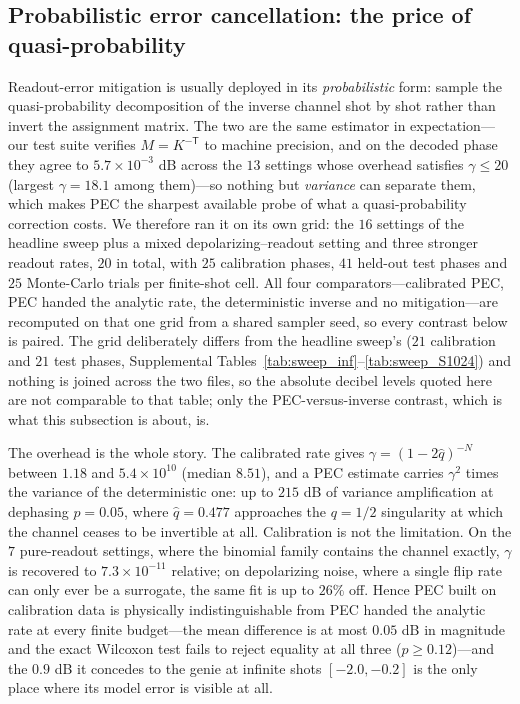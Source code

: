 \documentclass[ASNA,twocolumn]{USG}
\begin{document}
\subsection{Probabilistic error cancellation: the price of quasi-probability}
\label{subsec:pec}

Readout-error mitigation is usually deployed in its \emph{probabilistic} form:
sample the quasi-probability decomposition of the inverse channel shot by shot
rather than invert the assignment matrix.  The two are the same estimator in
expectation---our test suite verifies $M = K^{-\mathsf T}$ to machine precision,
and on the decoded phase they agree to $5.7\times10^{-3}$ dB across the $13$
settings whose overhead satisfies $\gamma\le20$ (largest $\gamma=18.1$ among
them)---so nothing but \emph{variance} can separate them, which makes PEC the
sharpest available probe of what a quasi-probability correction costs.  We
therefore ran it on its own grid: the $16$ settings of the headline sweep plus a
mixed depolarizing--readout setting and three stronger readout rates, $20$ in
total, with $25$ calibration phases, $41$ held-out test phases and $25$
Monte-Carlo trials per finite-shot cell.  All four comparators---calibrated PEC,
PEC handed the analytic rate, the deterministic inverse and no mitigation---are
recomputed on that one grid from a shared sampler seed, so every contrast below
is paired.  The grid deliberately differs from the headline sweep's ($21$
calibration and $21$ test phases, Supplemental
Tables~\ref{tab:sweep_inf}--\ref{tab:sweep_S1024}) and nothing is joined across
the two files, so the absolute decibel levels quoted here are not comparable to
that table; only the PEC-versus-inverse contrast, which is what this subsection
is about, is.

The overhead is the whole story.  The calibrated rate gives
$\gamma=(1-2\hat q)^{-N}$ between $1.18$ and $5.4\times10^{10}$ (median $8.51$),
and a PEC estimate carries $\gamma^2$ times the variance of the deterministic
one: up to $215$ dB of variance amplification at dephasing $p=0.05$, where
$\hat q=0.477$ approaches the $q=1/2$ singularity at which the channel ceases to
be invertible at all.  Calibration is not the limitation.  On the $7$
pure-readout settings, where the binomial family contains the channel exactly,
$\gamma$ is recovered to $7.3\times10^{-11}$ relative; on depolarizing noise,
where a single flip rate can only ever be a surrogate, the same fit is up to
$26\%$ off.  Hence PEC built on calibration data is physically indistinguishable
from PEC handed the analytic rate at every finite budget---the mean difference is
at most $0.05$ dB in magnitude and the exact Wilcoxon test fails to reject
equality at all three ($p\ge0.12$)---and the $0.9$ dB it concedes to the genie at
infinite shots $[-2.0,-0.2]$ is the only place where its model error is visible
at all.
\end{document}
